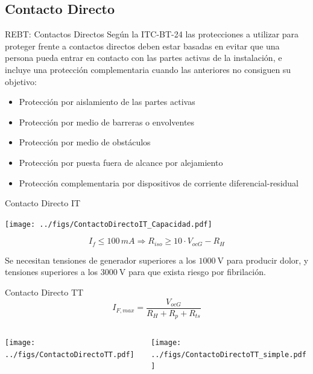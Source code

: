 \documentclass[aspectratio=169, usenames,svgnames,dvipsnames]{beamer}
\begin{document}
\subsection{Contacto Directo}
\label{sec:org913eddb}

\begin{frame}[label={sec:org6eb2086}]{REBT: Contactos Directos}
Según la ITC-BT-24 las protecciones a utilizar para proteger frente a
contactos directos deben estar \alert{basadas en evitar que una persona pueda
entrar en contacto con las partes activas} de la instalación, e incluye
una protección complementaria cuando las anteriores no consiguen su
objetivo:

\begin{itemize}
\item Protección por \alert{aislamiento de las partes activas}

\item Protección por medio de \alert{barreras o envolventes}

\item Protección por medio de \alert{obstáculos}

\item Protección por puesta \alert{fuera de alcance} por alejamiento

\item Protección complementaria por \alert{dispositivos de corriente
diferencial}-residual
\end{itemize}
\end{frame}


\begin{frame}[label={sec:org916c48b}]{Contacto Directo IT}
\begin{center}
\texttt{[image: ../figs/ContactoDirectoIT\_Capacidad.pdf]}
\end{center}

$$I_{f}\leq100\, mA\Longrightarrow R_{iso}\geq10\cdot V_{ocG}-R_{H}$$

Se necesitan tensiones de generador superiores a los \(\SI{1000}{\volt}\)
para producir dolor, y tensiones superiores a los \(\SI{3000}{\volt}\)
para que exista riesgo por fibrilación.
\end{frame}

\begin{frame}[label={sec:orgc22e3d0}]{Contacto Directo TT}
$$I_{F,max}=\frac{V_{ocG}}{R_{H}+R_{p}+R_{ts}}$$

\begin{columns}
\begin{column}{0.5\columnwidth}
\begin{center}
\texttt{[image: ../figs/ContactoDirectoTT.pdf]}
\end{center}
\end{column}

\begin{column}{0.5\columnwidth}
\begin{center}
\texttt{[image: ../figs/ContactoDirectoTT\_simple.pdf]}
\end{center}
\end{column}
\end{columns}
\end{frame}
\end{document}
